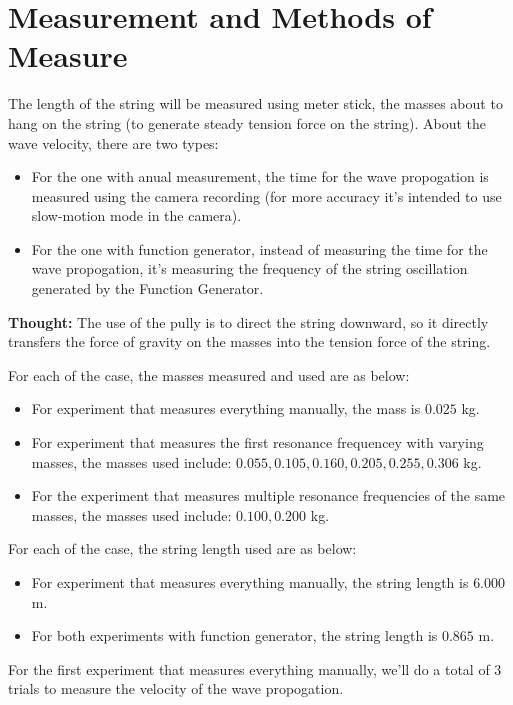 \documentclass{article}
\begin{document}
\hfil

\section{Measurement and Methods of Measure}
The length of the string will be measured using meter stick, the masses about to hang on the string (to generate steady tension force on the string). About the wave velocity, there are two types:
\begin{itemize}
    \item For the one with anual measurement, the time for the wave propogation is measured using the camera recording (for more accuracy it's intended to use slow-motion mode in the camera).
    \item For the one with function generator, instead of measuring the time for the wave propogation, it's measuring the frequency of the string oscillation generated by the Function Generator.
\end{itemize}

\textbf{Thought:} The use of the pully is to direct the string downward, so it directly transfers the force of gravity on the masses into the tension force of the string.

\hfill

For each of the case, the masses measured and used are as below:
\begin{itemize}
    \item[1.] For experiment that measures everything manually, the mass is $0.025$ kg.
    \item[2.] For experiment that measures the first resonance frequencey with varying masses, the masses used include: $0.055,0.105,0.160,0.205,0.255,0.306$ kg.
    \item[3.] For the experiment that measures multiple resonance frequencies of the same masses, the masses used include: $0.100, 0.200$ kg.  
\end{itemize}

For each of the case, the string length used are as below:
\begin{itemize}
    \item For experiment that measures everything manually, the string length is $6.000$ m.
    \item For both experiments with function generator, the string length is $0.865$ m.
\end{itemize}

\hfil

For the first experiment that measures everything manually, we'll do a total of $3$ trials to measure the velocity of the wave propogation.
\end{document}
